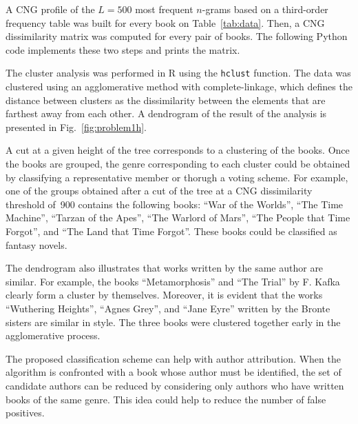 \documentclass[conference]{IEEEtran}
\newcommand{\codeinline}[1]{{\fontsize{8}{0}\selectfont\texttt{#1}}}
\newcommand{\codefile}[1]{
  \begin{framed}
  \fontsize{5.65}{6.78}\selectfont
  
  \end{framed}
}
\begin{document}
A CNG profile of the $L=500$ most frequent \mbox{$n$-grams} based on a third-order frequency table was built for every book on Table~\ref{tab:data}.
Then, a CNG dissimilarity matrix was computed for every pair of books.
The following Python code implements these two steps and prints the matrix.

\codefile{problem1h.py}

The cluster analysis was performed in R using the \codeinline{hclust} function.
The data was clustered using an agglomerative method with complete-linkage, which defines the distance between clusters as the dissimilarity between the elements that are farthest away from each other.
A dendrogram of the result of the analysis is presented in Fig.~\ref{fig:problem1h}.

A cut at a given height of the tree corresponds to a clustering of the books.
Once the books are grouped, the genre corresponding to each cluster could be obtained by classifying a representative member or thorugh a voting scheme.
For example, one of the groups obtained after a cut of the tree at a CNG dissimilarity threshold of~900 contains the following books:
``War of the Worlds'', ``The Time Machine'', ``Tarzan of the Apes'', ``The Warlord of Mars'', ``The People that Time Forgot'', and ``The Land that Time Forgot''.
These books could be classified as fantasy novels.

The dendrogram also illustrates that works written by the same author are similar.
For example, the books ``Metamorphosis'' and ``The Trial'' by F. Kafka clearly form a cluster by themselves.
Moreover, it is evident that the works ``Wuthering Heights'', ``Agnes Grey'', and ``Jane Eyre'' written by the Bronte sisters are similar in style.
The three books were clustered together early in the agglomerative process.

The proposed classification scheme can help with author attribution.
When the algorithm is confronted with a book whose author must be identified, the set of candidate authors can be reduced by considering only authors who have written books of the same genre.
This idea could help to reduce the number of false positives.
\end{document}
